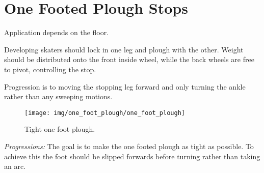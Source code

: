 \section{One Footed Plough Stops}
\label{sec:stopping/plough_one_foot}

Application depends on the floor.

Developing skaters should lock in one leg and plough with the other. 
Weight should be distributed onto the front inside wheel, while the back wheels are free to pivot, controlling the stop. 

Progression is to moving the stopping leg forward and only turning the ankle rather than any sweeping motions. 


\begin{figure}
\centering
\texttt{[image: img/one\_foot\_plough/one\_foot\_plough]}
\caption{Tight one foot plough.}
\end{figure}

{\it Progressions:}
The goal is to make the one footed plough as tight as possible.
To achieve this the foot should be slipped forwards before turning rather than taking an arc.
